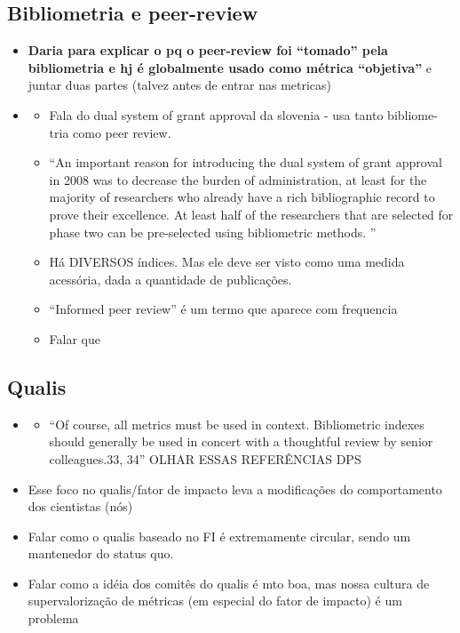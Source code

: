 \documentclass[11pt]{article}
\begin{document}
\subsection{Bibliometria e peer-review}
\label{sec:orga9a2cb9}
\begin{itemize}
\item \textbf{Daria para explicar o pq o peer-review foi ``tomado'' pela bibliometria e hj é globalmente usado como métrica ``objetiva''} e juntar duas partes (talvez antes de entrar nas metricas)
\item \cite{juznic2010}
\begin{itemize}
\item Fala do dual system of grant approval da slovenia - usa tanto bibliome- tria como peer review.
\item “An important reason for introducing the dual system of grant approval in 2008 was to decrease the burden of administration, at least for the majority of researchers who already have a rich bibliographic record to prove their excellence. At least half of the researchers that are selected for phase two can be pre-selected using bibliometric methods. ”
\item Há DIVERSOS índices. Mas ele deve ser visto como uma medida acessória, dada a quantidade de publicações.
\item ``Informed peer review'' é um termo que aparece com frequencia
\item Falar que
\end{itemize}
\end{itemize}


\subsection{Qualis}
\label{sec:orga78d853}
\begin{itemize}
\item \cite{thompson2015}
\begin{itemize}
\item “Of course, all metrics must be used in context. Bibliometric indexes should generally be used in concert with a thoughtful review by senior colleagues.33, 34” OLHAR ESSAS REFERÊNCIAS DPS
\end{itemize}
\item Esse foco no qualis/fator de impacto leva a modificações do comportamento dos cientistas (nós)
\item Falar como o qualis baseado no FI é extremamente circular, sendo um mantenedor do status quo.
\item Falar como a idéia dos comitês do qualis é mto boa, mas nossa cultura de supervalorização de métricas (em especial do fator de impacto) é um problema
\end{itemize}
\end{document}
